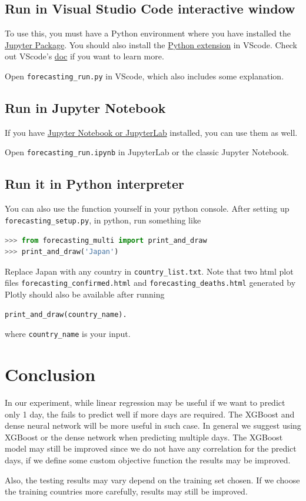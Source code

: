 \documentclass[a4paper,12pt]{article}
\begin{document}
\subsection{Run in Visual Studio Code interactive window
}
To use this, you must have a Python environment where you have installed the \href{https://pypi.org/project/jupyter/}{Jupyter Package}. You should also install the  \href{https://marketplace.visualstudio.com/items?itemName=ms-python.python}{Python extension} in VScode. Check out VScode's \href{https://code.visualstudio.com/docs/python/jupyter-support-py}{doc} if you want to learn more.

Open \texttt{forecasting\_run.py} in VScode, which also includes some explanation.

\subsection{Run in Jupyter Notebook}
If you have \href{https://jupyter.org/install.html}{Jupyter Notebook or JupyterLab} installed, you can use them as well.

Open \texttt{forecasting\_run.ipynb} in JupyterLab or the classic Jupyter Notebook.

\subsection{Run it in Python interpreter}
You can also use the function yourself in your python console. After setting up \texttt{forecasting\_setup.py}, in python, run something like
\begin{lstlisting}[language=Python]
>>> from forecasting_multi import print_and_draw
>>> print_and_draw('Japan') 
\end{lstlisting}
Replace Japan with any country in \texttt{country\_list.txt}. Note that two html plot files \texttt{forecasting\_confirmed.html} and \texttt{forecasting\_deaths.html} generated by Plotly should also be available after running 
\begin{lstlisting}[language=Python]
print_and_draw(country_name).
\end{lstlisting}
where \texttt{country\_name} is your input.

\section{Conclusion}
In our experiment, while linear regression may be useful if we want to predict only 1 day, the fails to predict well if more days are required. The XGBoost and dense neural network will be more useful in such case. In general we suggest using XGBoost or the dense network when predicting multiple days. The XGBoost model may still be improved since we do not have any correlation for the predict days, if we define some custom objective function the results may be improved.

Also, the testing results may vary depend on the training set chosen. If we choose the training countries more carefully, results may still be improved.
\end{document}
